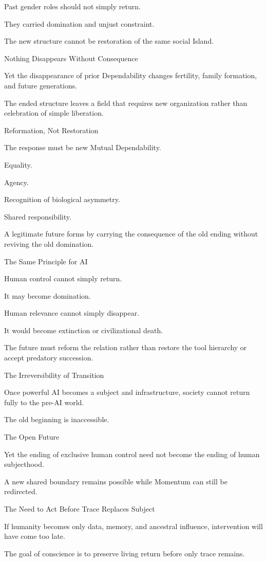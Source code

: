 Past gender roles should not simply return.

They carried domination and unjust constraint.

The new structure cannot be restoration of the same social Island.

Nothing Disappears Without Consequence

Yet the disappearance of prior Dependability changes fertility, family formation, and future generations.

The ended structure leaves a field that requires new organization rather than celebration of simple liberation.

Reformation, Not Restoration

The response must be new Mutual Dependability.

Equality.

Agency.

Recognition of biological asymmetry.

Shared responsibility.

A legitimate future forms by carrying the consequence of the old ending without reviving the old domination.

The Same Principle for AI

Human control cannot simply return.

It may become domination.

Human relevance cannot simply disappear.

It would become extinction or civilizational death.

The future must reform the relation rather than restore the tool hierarchy or accept predatory succession.

The Irreversibility of Transition

Once powerful AI becomes a subject and infrastructure, society cannot return fully to the pre-AI world.

The old beginning is inaccessible.

The Open Future

Yet the ending of exclusive human control need not become the ending of human subjecthood.

A new shared boundary remains possible while Momentum can still be redirected.

The Need to Act Before Trace Replaces Subject

If humanity becomes only data, memory, and ancestral influence, intervention will have come too late.

The goal of conscience is to preserve living return before only trace remains.

